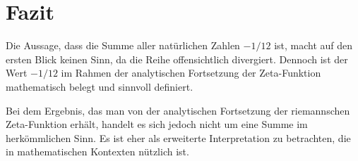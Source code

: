 %
%
%
%
\section{Fazit
\label{Fazit}}

Die Aussage, dass die Summe aller natürlichen Zahlen $-1/12$ ist, macht auf den ersten Blick keinen Sinn, da die Reihe offensichtlich
divergiert. Dennoch ist der Wert $-1/12$ im Rahmen der analytischen
Fortsetzung der Zeta-Funktion mathematisch belegt und sinnvoll
definiert.

Bei dem Ergebnis, das man von der analytischen Fortsetzung der
riemannschen Zeta-Funktion erhält, handelt es sich jedoch nicht um eine
Summe im herkömmlichen Sinn. Es ist eher als erweiterte Interpretation
zu betrachten, die in mathematischen Kontexten nützlich ist.


